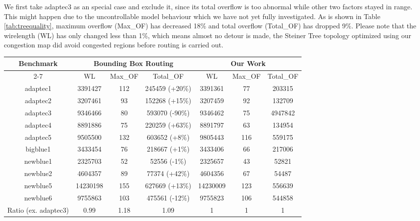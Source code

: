 We first take adaptec3 as an special case and exclude it, since its total overflow is too abnormal while other two factors stayed in range. This might happen due to the uncontrollable model behaviour which we have not yet fully investigated. As is shown in Table \ref{tab:treequality}, maximum overflow (Max\_OF) has decreased 18\% and total overflow (Total\_OF) has dropped 9\%. Please note that the wirelength (WL) has only changed less than 1\%, which means almost no detour is made, the Steiner Tree topology optimized using our congestion map did avoid congested regions before routing is carried out.



\begin{table*}[htbp]
\caption{Result of Steiner Tree quality after edge shifting}
\begin{center}
\begin{tabular}{|c|c|c|c|c|c|c|}
\hline
\multirow{2}{*}{Benchmark} & \multicolumn{3}{c|}{Bounding Box Routing}     & \multicolumn{3}{c|}{Our Work}  \\ \cline{2-7} 
                           & WL       & Max\_OF & Total\_OF      & WL       & Max\_OF & Total\_OF \\ \hline
adaptec1                   & 3391427  & 112     & 245459 (+20\%) & 3391361  & 77      & 203315    \\ \hline
adaptec2                   & 3207461  & 93      & 152268 (+15\%) & 3207459  & 92      & 132709    \\ \hline
adaptec3                   & 9346466  & 80      & 593070 (-90\%) & 9346462  & 75      & 4947842   \\ \hline
adaptec4                   & 8891886  & 75      & 220259 (+63\%) & 8891797  & 63      & 134954    \\ \hline
adaptec5                   & 9505500  & 132     & 603652 (+8\%)  & 9805443  & 116     & 559175    \\ \hline
bigblue1                   & 3433454  & 76      & 218667 (+1\%)  & 3433406  & 66      & 217006    \\ \hline
newblue1                   & 2325703  & 52      & 52556 (-1\%)   & 2325657  & 43      & 52821     \\ \hline
newblue2                   & 4604357  & 89      & 77374 (+42\%)  & 4604356  & 67      & 54487     \\ \hline
newblue5                   & 14230198 & 155     & 627669 (+13\%) & 14230009 & 123     & 556639    \\ \hline
newblue6                   & 9755863  & 103     & 475561 (-12\%) & 9755823  & 106     & 544858    \\ \hline
Ratio (ex. adaptec3)       & 0.99     & 1.18    & 1.09           & 1        & 1       & 1         \\ \hline
\end{tabular}
\label{tab:treequality}
\end{center}
\end{table*}


